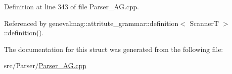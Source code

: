 Definition at line 343 of file Parser\_\-AG.cpp.



Referenced by genevalmag::attritute\_\-grammar::definition$<$ ScannerT $>$::definition().



The documentation for this struct was generated from the following file:\begin{DoxyCompactItemize}
\item 
src/Parser/\hyperlink{Parser__AG_8cpp}{Parser\_\-AG.cpp}\end{DoxyCompactItemize}
